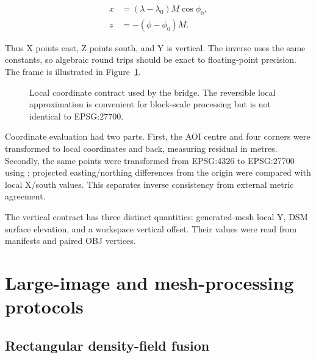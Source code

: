 \begin{align}
x &= (\lambda-\lambda_0)M\cos\phi_0,\\
z &= -(\phi-\phi_0)M.
\end{align}

Thus X points east, Z points south, and Y is vertical.  The inverse uses the
same constants, so algebraic round trips should be exact to floating-point
precision.  The frame is illustrated in Figure~\ref{fig:coordinate-frame}.

\begin{figure}[H]
\centering
{}
\caption{Local coordinate contract used by the bridge.  The reversible local
approximation is convenient for block-scale processing but is not identical to
EPSG:27700.}
\label{fig:coordinate-frame}
\end{figure}

Coordinate evaluation had two parts.  First, the AOI centre and four corners
were transformed to local coordinates and back, measuring residual in metres.
Secondly, the same points were transformed from EPSG:4326 to EPSG:27700 using
; projected easting/northing differences from the origin were
compared with local X/south values.  This separates inverse consistency from
external metric agreement.

The vertical contract has three distinct quantities: generated-mesh local Y,
DSM surface elevation, and a workspace vertical offset.  Their values were
read from manifests and paired OBJ vertices.

\section{Large-image and mesh-processing protocols}

\subsection{Rectangular density-field fusion}

